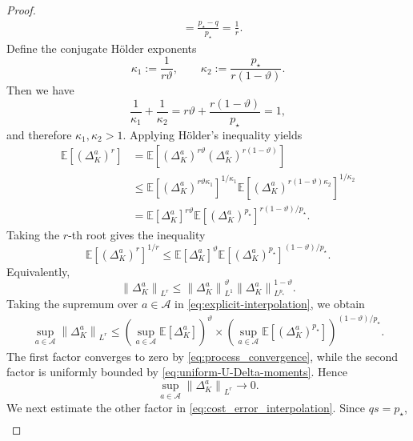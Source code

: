 \documentclass[11pt]{article}
\theoremstyle{remarkitalic}
\theoremstyle{remarkitalic}
\newcommand{\E}{\mathbb E}
\newcommand{\1}{\mathbf 1}
\newcommand{\norm}[1]{\left\lVert #1 \right\rVert}
\begin{document}
{\begin{proof}
\begin{align*}
    &=
    \frac{p_\star-q}{p_\star}
    =
    \frac1r.
\end{align*} Define the conjugate Hölder exponents
\[
    \kappa_1
    :=
    \frac{1}{r\vartheta},
    \qquad
    \kappa_2
    :=
    \frac{p_\star}{r(1-\vartheta)}.
\]
Then we have
\[
    \frac1{\kappa_1}+\frac1{\kappa_2}
    =
    r\vartheta
    +
    \frac{r(1-\vartheta)}{p_\star}
    =
    1,
\]
and therefore $\kappa_1,\kappa_2>1$. Applying Hölder's
inequality yields
\begin{align*}
    \E\left[(\Delta_K^a)^r\right]
    &=
    \E\left[
        (\Delta_K^a)^{r\vartheta}
        (\Delta_K^a)^{r(1-\vartheta)}
    \right]\\
    &\le
    \E\left[
        (\Delta_K^a)^{r\vartheta\kappa_1}
    \right]^{1/\kappa_1}
    \E\left[
        (\Delta_K^a)^{r(1-\vartheta)\kappa_2}
    \right]^{1/\kappa_2}\\
    &=
    \E[\Delta_K^a]^{r\vartheta}
    \E\left[
        (\Delta_K^a)^{p_\star}
    \right]^{r(1-\vartheta)/p_\star}.
\end{align*}
Taking the $r$-th root gives the inequality
\begin{equation}
\label{eq:explicit-interpolation}
    \E\left[(\Delta_K^a)^r\right]^{1/r}
    \le
    \E[\Delta_K^a]^\vartheta
    \E\left[
        (\Delta_K^a)^{p_\star}
    \right]^{(1-\vartheta)/p_\star}.
\end{equation}
Equivalently,
\[
    \norm{\Delta_K^a}_{L^r}
    \le
    \norm{\Delta_K^a}_{L^1}^{\vartheta}
    \norm{\Delta_K^a}_{L^{p_\star}}^{1-\vartheta}.
\] Taking the supremum over $a\in\mathcal A$ in
\eqref{eq:explicit-interpolation}, we obtain
\begin{align*}
    \sup_{a\in\mathcal A}
    \norm{\Delta_K^a}_{L^r}
    \le
    \left(
        \sup_{a\in\mathcal A}
        \E[\Delta_K^a]
    \right)^\vartheta \times
    \left(
        \sup_{a\in\mathcal A}
        \E\left[
            (\Delta_K^a)^{p_\star}
        \right]
    \right)^{(1-\vartheta)/p_\star}.
\end{align*}
The first factor converges to zero by
\eqref{eq:process_convergence}, while the second factor is uniformly
bounded by \eqref{eq:uniform-U-Delta-moments}. Hence
\begin{equation}
\label{eq:delta_interpolation}
    \sup_{a\in\mathcal A}
    \norm{\Delta_K^a}_{L^r}
    \longrightarrow0.
\end{equation}
We next estimate the other factor in
\eqref{eq:cost_error_interpolation}. Since $qs=p_\star$,
\begin{align*}

\end{align*}
\end{proof}}
\end{document}
